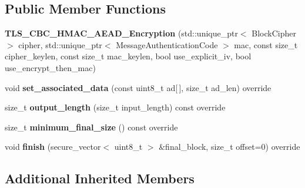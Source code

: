\subsection*{Public Member Functions}
\begin{DoxyCompactItemize}
\item 
\mbox{\label{class_botan_1_1_t_l_s_1_1_t_l_s___c_b_c___h_m_a_c___a_e_a_d___encryption_a02dc8a1b06890641f251041ca319fdf2}} 
{\bfseries T\+L\+S\+\_\+\+C\+B\+C\+\_\+\+H\+M\+A\+C\+\_\+\+A\+E\+A\+D\+\_\+\+Encryption} (std\+::unique\+\_\+ptr$<$ Block\+Cipher $>$ cipher, std\+::unique\+\_\+ptr$<$ Message\+Authentication\+Code $>$ mac, const size\+\_\+t cipher\+\_\+keylen, const size\+\_\+t mac\+\_\+keylen, bool use\+\_\+explicit\+\_\+iv, bool use\+\_\+encrypt\+\_\+then\+\_\+mac)
\item 
\mbox{\label{class_botan_1_1_t_l_s_1_1_t_l_s___c_b_c___h_m_a_c___a_e_a_d___encryption_a320304a7e22d32ea3e1bc79f8bbd379c}} 
void {\bfseries set\+\_\+associated\+\_\+data} (const uint8\+\_\+t ad\mbox{[}$\,$\mbox{]}, size\+\_\+t ad\+\_\+len) override
\item 
\mbox{\label{class_botan_1_1_t_l_s_1_1_t_l_s___c_b_c___h_m_a_c___a_e_a_d___encryption_ac3b1f6fb283e072d8c61209d8c6ddbaa}} 
size\+\_\+t {\bfseries output\+\_\+length} (size\+\_\+t input\+\_\+length) const override
\item 
\mbox{\label{class_botan_1_1_t_l_s_1_1_t_l_s___c_b_c___h_m_a_c___a_e_a_d___encryption_a857361ec4b44af753055cec85e8e3a2e}} 
size\+\_\+t {\bfseries minimum\+\_\+final\+\_\+size} () const override
\item 
\mbox{\label{class_botan_1_1_t_l_s_1_1_t_l_s___c_b_c___h_m_a_c___a_e_a_d___encryption_a64e88383bb8853d03c1ddd958af8512e}} 
void {\bfseries finish} (secure\+\_\+vector$<$ uint8\+\_\+t $>$ \&final\+\_\+block, size\+\_\+t offset=0) override
\end{DoxyCompactItemize}
\subsection*{Additional Inherited Members}


